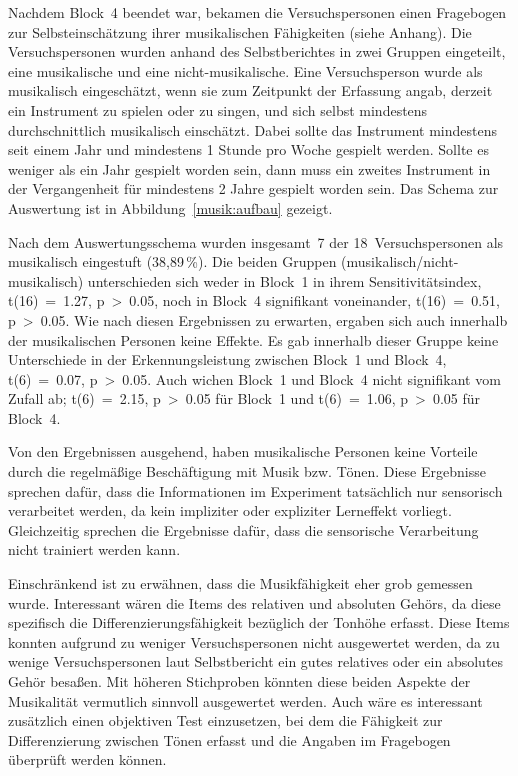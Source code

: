 \documentclass[doc,a4paper,12pt]{apa6}
\begin{document}
Nachdem Block~4 beendet war, bekamen die Versuchspersonen einen Fragebogen zur Selbsteinschätzung ihrer musikalischen Fähigkeiten (siehe Anhang). Die Versuchspersonen wurden anhand des Selbstberichtes in zwei Gruppen eingeteilt, eine musikalische und eine nicht-musikalische. Eine Versuchsperson wurde als musikalisch eingeschätzt, wenn sie zum Zeitpunkt der Erfassung angab, derzeit ein Instrument zu spielen oder zu singen, und sich selbst mindestens durchschnittlich musikalisch einschätzt. Dabei sollte das Instrument mindestens seit einem Jahr und mindestens 1 Stunde pro Woche gespielt werden. Sollte es weniger als ein Jahr gespielt worden sein, dann muss ein zweites Instrument in der Vergangenheit für mindestens 2 Jahre gespielt worden sein. Das Schema zur Auswertung ist in Abbildung~\ref{musik:aufbau} gezeigt.

Nach dem Auswertungsschema wurden insgesamt~7 der 18~Versuchspersonen als musikalisch eingestuft (38,89\,\%). Die beiden Gruppen (musikalisch/nicht-musikalisch) unterschieden sich weder in Block~1 in ihrem Sensitivitätsindex, t(16)~=~1.27, p~>~0.05, noch in Block~4 signifikant voneinander, t(16)~=~0.51, p~>~0.05. Wie nach diesen Ergebnissen zu erwarten, ergaben sich auch innerhalb der musikalischen Personen keine Effekte. Es gab innerhalb dieser Gruppe keine Unterschiede in der Erkennungsleistung zwischen Block~1 und Block~4, t(6)~=~0.07, p~>~0.05. Auch wichen Block~1 und Block~4 nicht signifikant vom Zufall ab; t(6)~=~2.15, p~>~0.05 für Block~1 und t(6)~=~1.06, p~>~0.05 für Block~4.

Von den Ergebnissen ausgehend, haben musikalische Personen keine Vorteile durch die regelmäßige Beschäftigung mit Musik bzw. Tönen. Diese Ergebnisse sprechen dafür, dass die Informationen im Experiment tatsächlich nur sensorisch verarbeitet werden, da kein impliziter oder expliziter Lerneffekt vorliegt. Gleichzeitig sprechen die Ergebnisse dafür, dass die sensorische Verarbeitung nicht trainiert werden kann.

Einschränkend ist zu erwähnen, dass die Musikfähigkeit eher grob gemessen wurde. Interessant wären die Items des relativen und absoluten Gehörs, da diese spezifisch die Differenzierungsfähigkeit bezüglich der Tonhöhe erfasst. Diese Items konnten aufgrund zu weniger Versuchspersonen nicht ausgewertet werden, da zu wenige Versuchspersonen laut Selbstbericht ein gutes relatives oder ein absolutes Gehör besaßen. Mit höheren Stichproben könnten diese beiden Aspekte der Musikalität vermutlich sinnvoll ausgewertet werden. Auch wäre es interessant zusätzlich einen objektiven Test einzusetzen, bei dem die Fähigkeit zur Differenzierung zwischen Tönen erfasst und die Angaben im Fragebogen überprüft werden können.
\end{document}
